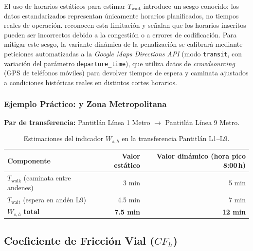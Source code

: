 El uso de horarios \gtfs{} estáticos para estimar $T_{\text{wait}}$ introduce un
sesgo conocido: los datos estandarizados representan únicamente horarios
planificados, no tiempos reales de operación. \textcite{fortin2016innovative} reconocen esta
limitación y señalan que los horarios inscritos pueden ser incorrectos debido a la
congestión o a errores de codificación. Para mitigar este sesgo, la variante
dinámica de la penalización se calibrará mediante peticiones automatizadas a la
\textit{Google Maps Directions API} (modo \texttt{transit}, con variación del
parámetro \texttt{departure\_time}), que utiliza datos de \textit{crowdsourcing}
(GPS de teléfonos móviles) para devolver tiempos de espera y caminata ajustados
a condiciones históricas reales en distintos cortes horarios.

\subsubsection{Ejemplo Práctico: \cdmx{} y Zona Metropolitana}

\textbf{Par de transferencia:} Pantitlán Línea 1 Metro $\to$ Pantitlán Línea 9 Metro.

\begin{table}[H]
    \centering
    \caption{Estimaciones del indicador $W_{s,h}$ en la transferencia Pantitlán L1--L9.}
    \label{tab:penalizacion}
    \begin{tabularx}{\textwidth}{X r r}
        \toprule
        \textbf{Componente} & \textbf{Valor estático} &
        \textbf{Valor dinámico (hora pico 8:00\,h)} \\
        \midrule
        $T_{\text{walk}}$ (caminata entre andenes) & 3 min & 5 min \\
        $T_{\text{wait}}$ (espera en andén L9) & 4.5 min & 7 min \\
        $W_{s,h}$ \textbf{total} & \textbf{7.5 min} & \textbf{12 min} \\
        \bottomrule
    \end{tabularx}
\end{table}

\subsection{Coeficiente de Fricción Vial \texorpdfstring{($CF_h$)}{(CFh)}}
\label{subsec:friccion-vial}

